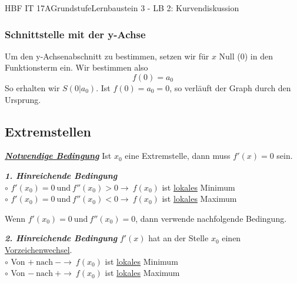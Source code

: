 \documentclass[11pt,twocolumn,oneside,openany,headings=optiontotoc,11pt,numbers=noenddot]{article}
\begin{document}
\begin{worksheet}{HBF IT 17A}{Grundstufe}{Lernbaustein 3 - LB 2: Kurvendiskussion}
		\subsubsection{Schnittstelle mit der y-Achse} Um den y-Achsenabschnitt zu bestimmen, setzen wir für \(x\) Null (\(0\)) in den Funktionsterm ein. Wir bestimmen also \[f(0) = a_0\]
		So erhalten wir \(S(0|a_0)\). Ist \(f(0) = a_0 = 0\), so verläuft der Graph durch den Ursprung.
		\subsection{Extremstellen} \underline{\textit{\textbf{Notwendige Bedingung}}} Ist \(x_0\) eine Extremstelle, dann muss \(f'(x) = 0\) sein.\\
		\par\noindent
		\textbf{\textit{1. Hinreichende Bedingung}}\\
		\(\circ\) \(f'(x_0)=0\ \text{und}\ f''(x_0) > 0 \rightarrow\ f(x_0)\) ist \underline{lokales} Minimum\\
		\(\circ\) \(f'(x_0)=0\ \text{und}\ f''(x_0) < 0 \rightarrow\ f(x_0)\) ist \underline{lokales} Maximum\\
		\par\noindent
		Wenn \(f'(x_0)=0\ \text{und}\ f''(x_0)=0\), dann verwende nachfolgende Bedingung.\\
		\par\noindent
		\textit{\textbf{2. Hinreichende Bedingung}} \(f'(x)\) hat an der Stelle \(x_0\) einen \underline{Vorzeichenwechsel}.\\
		\(\circ\) Von \(+\ \text{nach}\ - \rightarrow\ f(x_0)\) ist \underline{lokales} Minimum\\
		\(\circ\) Von \(-\ \text{nach}\ + \rightarrow\ f(x_0)\) ist \underline{lokales} Maximum\\

\end{worksheet}
\end{document}
